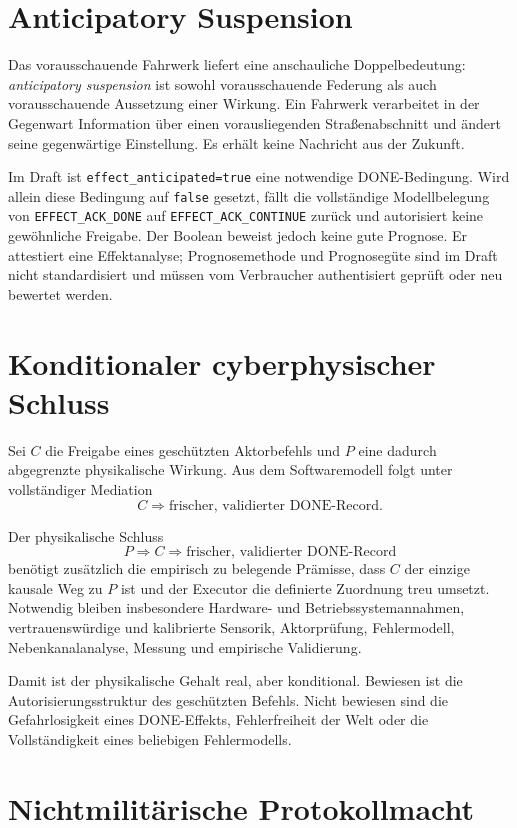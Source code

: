 \documentclass[11pt,a4paper]{article}
\newcommand{\DONE}{\texttt{EFFECT\_ACK\_DONE}}
\newcommand{\CONTINUE}{\texttt{EFFECT\_ACK\_CONTINUE}}
\begin{document}
\section{Anticipatory Suspension}

Das vorausschauende Fahrwerk liefert eine anschauliche Doppelbedeutung:
\emph{anticipatory suspension} ist sowohl vorausschauende Federung als auch
vorausschauende Aussetzung einer Wirkung. Ein Fahrwerk verarbeitet in der
Gegenwart Information über einen vorausliegenden Straßenabschnitt und ändert
seine gegenwärtige Einstellung. Es erhält keine Nachricht aus der Zukunft.

Im Draft ist \texttt{effect\_anticipated=true} eine notwendige
DONE-Bedingung. Wird allein diese Bedingung auf \texttt{false} gesetzt, fällt
die vollständige Modellbelegung von \DONE{} auf \CONTINUE{} zurück und autorisiert
keine gewöhnliche Freigabe. Der Boolean beweist jedoch keine gute Prognose. Er
attestiert eine Effektanalyse; Prognosemethode und Prognosegüte sind im Draft
nicht standardisiert und müssen vom Verbraucher authentisiert geprüft oder
neu bewertet werden.

\section{Konditionaler cyberphysischer Schluss}

Sei $C$ die Freigabe eines geschützten Aktorbefehls und $P$ eine dadurch
abgegrenzte physikalische Wirkung. Aus dem Softwaremodell folgt unter
vollständiger Mediation
\[
C\Longrightarrow\text{frischer, validierter DONE-Record}.
\]

Der physikalische Schluss
\[
P\Longrightarrow C\Longrightarrow\text{frischer, validierter DONE-Record}
\]
benötigt zusätzlich die empirisch zu belegende Prämisse, dass $C$ der einzige
kausale Weg zu $P$ ist und der Executor die definierte Zuordnung treu umsetzt.
Notwendig bleiben insbesondere Hardware- und Betriebssystemannahmen,
vertrauenswürdige und kalibrierte Sensorik, Aktorprüfung, Fehlermodell,
Nebenkanalanalyse, Messung und empirische Validierung.

Damit ist der physikalische Gehalt real, aber konditional. Bewiesen ist die
Autorisierungsstruktur des geschützten Befehls. Nicht bewiesen sind die
Gefahrlosigkeit eines DONE-Effekts, Fehlerfreiheit der Welt oder die
Vollständigkeit eines beliebigen Fehlermodells.

\section{Nichtmilitärische Protokollmacht}
\end{document}
